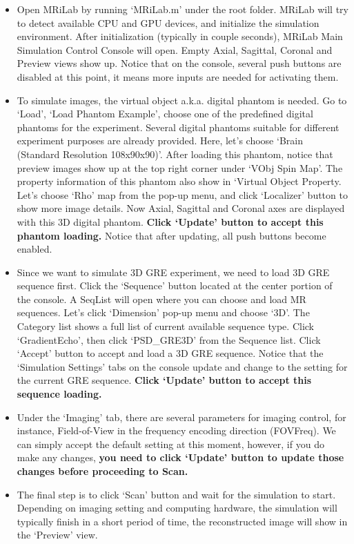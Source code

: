 \documentclass{book}%
\begin{document}
\begin{itemize}
\item Open MRiLab by running `MRiLab.m' under the root folder. MRiLab will try to detect available CPU and GPU devices, and initialize the simulation environment. After initialization (typically in couple seconds), MRiLab Main Simulation Control Console will open. Empty Axial, Sagittal, Coronal and Preview views show up. Notice that on the console, several push buttons are disabled at this point, it means more inputs are needed for activating them.
\item To simulate images, the virtual object a.k.a. digital phantom is needed. Go to `Load', `Load Phantom Example', choose one of the predefined digital phantoms for the experiment. Several digital phantoms suitable for different experiment purposes are already provided. Here, let's choose `Brain (Standard Resolution 108x90x90)'. After loading this phantom, notice that preview images show up at the top right corner under `VObj Spin Map'. The property information of this phantom also show in `Virtual Object Property. Let's choose `Rho' map from the pop-up menu, and click `Localizer' button to show more image details. Now Axial, Sagittal and Coronal axes are displayed with this 3D digital phantom. \textbf{Click `Update' button to accept this phantom loading.} Notice that after updating, all push buttons become enabled.
\item Since we want to simulate 3D GRE experiment, we need to load 3D GRE sequence first. Click the `Sequence' button located at the center portion of the console. A SeqList will open where you can choose and load MR sequences. Let's click `Dimension' pop-up menu and choose `3D'. The Category list shows a full list of current available sequence type. Click `GradientEcho', then click `PSD\_GRE3D' from the Sequence list. Click `Accept' button to accept and load a 3D GRE sequence. Notice that the `Simulation Settings' tabs on the console update and change to the setting for the current GRE sequence. \textbf{Click `Update' button to accept this sequence loading.}
\item Under the `Imaging' tab, there are several parameters for imaging control, for instance, Field-of-View in the frequency encoding direction (FOVFreq). We can simply accept the default setting at this moment, however, if you do make any changes, \textbf{you need to click `Update' button to update those changes before proceeding to Scan.}
\item The final step is to click `Scan' button and wait for the simulation to start. Depending on imaging setting and computing hardware, the simulation will typically finish in a short period of time, the reconstructed image will show in the `Preview' view.
\end{itemize}
\end{document}
